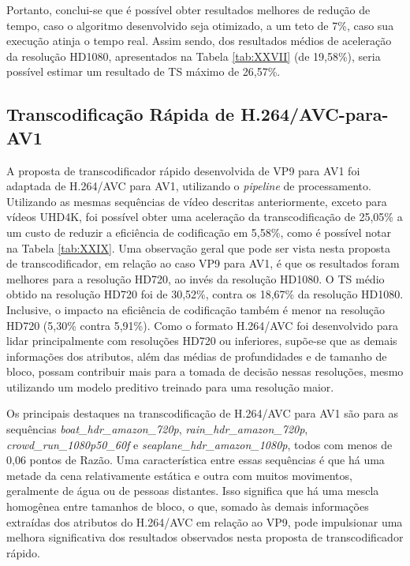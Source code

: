 Portanto, conclui-se que é possível obter resultados melhores de redução de tempo, caso o algoritmo desenvolvido seja otimizado, a um teto de 7\%, caso sua execução atinja o tempo real. Assim sendo, dos resultados médios de aceleração da resolução HD1080, apresentados na Tabela \ref{tab:XXVII} (de 19,58\%), seria possível estimar um resultado de TS máximo de 26,57\%.

\subsection{Transcodificação Rápida de H.264/AVC-para-AV1}
\label{cap:7.5.2}

A proposta de transcodificador rápido desenvolvida de VP9 para AV1 foi adaptada de H.264/AVC para AV1, utilizando o \textit{pipeline} de processamento. Utilizando as mesmas sequências de vídeo descritas anteriormente, exceto para vídeos UHD4K, foi possível obter uma aceleração da transcodificação de 25,05\% a um custo de reduzir a eficiência de codificação em 5,58\%, como é possível notar na Tabela \ref{tab:XXIX}. Uma observação geral que pode ser vista nesta proposta de transcodificador, em relação ao caso VP9 para AV1, é que os resultados foram melhores para a resolução HD720, ao invés da resolução HD1080. O TS médio obtido na resolução HD720 foi de 30,52\%, contra os 18,67\% da resolução HD1080. Inclusive, o impacto na eficiência de codificação também é menor na resolução HD720 (5,30\% contra 5,91\%). Como o formato H.264/AVC foi desenvolvido para lidar principalmente com resoluções HD720 ou inferiores, supõe-se que as demais informações dos atributos, além das médias de profundidades e de tamanho de bloco, possam contribuir mais para a tomada de decisão nessas resoluções, mesmo utilizando um modelo preditivo treinado para uma resolução maior.



Os principais destaques na transcodificação de H.264/AVC para AV1 são para as sequências \textit{boat\_hdr\_amazon\_720p}, \textit{rain\_hdr\_amazon\_720p}, \textit{crowd\_run\_1080p50\_60f} e \textit{seaplane\_hdr\_amazon\_1080p}, todos com menos de 0,06 pontos de Razão. Uma característica entre essas sequências é que há uma metade da cena relativamente estática e outra com muitos movimentos, geralmente de água ou de pessoas distantes. Isso significa que há uma mescla homogênea entre tamanhos de bloco, o que, somado às demais informações extraídas dos atributos do H.264/AVC em relação ao VP9, pode impulsionar uma melhora significativa dos resultados observados nesta proposta de transcodificador rápido.

